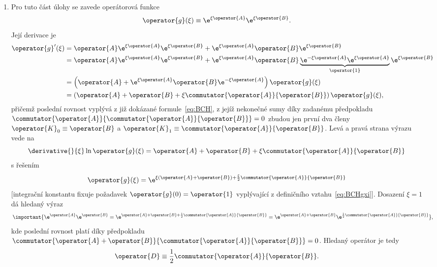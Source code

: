 \begin{solution}
\begin{enumerate}
    \item
        Pro tuto část úlohy se zavede operátorová funkce
		\begin{equation}
            \operator{g}(\xi)
                \equiv\e^{\xi\operator{A}}\e^{\xi\operator{B}}.
            \label{eq:BCHgxi}
        \end{equation}
		Její derivace je
		\begin{align}
            \operator{g}'(\xi)
				&=\operator{A}\e^{\xi\operator{A}}\e^{\xi\operator{B}}+\e^{\xi\operator{A}}\operator{B}\e^{\xi\operator{B}}\nonumber\\
				&=\operator{A}\e^{\xi\operator{A}}\e^{\xi\operator{B}}
					+\e^{\xi\operator{A}}\operator{B}\underbrace{\e^{-\xi\operator{A}}\e^{\xi\operator{A}}}_{\operator{1}}
					\e^{\xi\operator{B}}\nonumber\\
				&=\left(\operator{A}+\e^{\xi\operator{A}}\operator{B}\e^{-\xi\operator{A}}\right)\operator{g}(\xi)\nonumber\\
				&=\left(\operator{A}+\operator{B}+\xi\commutator{\operator{A}}{\operator{B}}\right)\operator{g}(\xi),
		\end{align}
		přičemž poslední rovnost vyplývá z již dokázané formule~\eqref{eq:BCH}, z jejíž nekonečné sumy díky zadanému předpokladu $\commutator{\operator{A}}{\commutator{\operator{A}}{\operator{B}}}=0$ zbudou jen první dva členy $\operator{K}_{0}\equiv\operator{B}$ a $\operator{K}_{1}\equiv\commutator{\operator{A}}{\operator{B}}$.
		Levá a pravá strana výrazu vede na 
		\begin{equation}
            \derivative{}{\xi}\ln{\operator{g}(\xi)}
                =\operator{A}+\operator{B}+\xi\commutator{\operator{A}}{\operator{B}}
		\end{equation}
		s řešením
		\begin{equation}
            \operator{g}(\xi)
                =\e^{\xi\left(\operator{A}+\operator{B}\right)+\frac{\xi}{2}\commutator{\operator{A}}{\operator{B}}}
		\end{equation}
		[integrační konstantu fixuje požadavek $\operator{g}(0)=\operator{1}$ vyplývající z definičního vztahu~\eqref{eq:BCHgxi}].
		Dosazení $\xi=1$ dá hledaný výraz
		\begin{equation}
			\important{\e^{\operator{A}}\e^{\operator{B}}
				=\e^{\operator{A}+\operator{B}+\frac{1}{2}\commutator{\operator{A}}{\operator{B}}}
                =\e^{\operator{A}+\operator{B}}\e^{\frac{1}{2}\commutator{\operator{A}}{\operator{B}}}
            },
            \label{eq:BCH1}
        \end{equation}
		kde poslední rovnost platí díky předpokladu $\commutator{\operator{A}+\operator{B}}{\commutator{\operator{A}}{\operator{B}}}=0$.
		Hledaný operátor je tedy
		\begin{equation}
            \operator{D}
                \equiv\frac{1}{2}\commutator{\operator{A}}{\operator{B}}.
        \end{equation}


\end{enumerate}
\end{solution}
